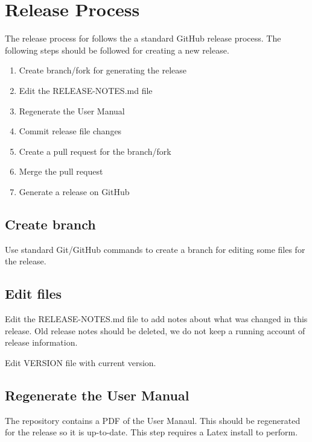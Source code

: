 
\chapter{Release Process}
\label{Release Process}

The release process for \parflow{} follows the a standard GitHub
release process.  The following steps should be followed for creating a new
\parflow{} release.

\begin{enumerate}
	\item Create branch/fork for generating the release
	\item Edit the RELEASE-NOTES.md file
	\item Regenerate the \parflow{} User Manual
        \item Commit release file changes
        \item Create a pull request for the branch/fork
        \item Merge the pull request
        \item Generate a release on GitHub
\end{enumerate}


\section{Create branch}

Use standard Git/GitHub commands to create a branch for editing some files for the release.

\section{Edit files}

Edit the RELEASE-NOTES.md file to add notes about what was changed in
this release.  Old release notes should be deleted, we do not keep a
running account of release information.

Edit VERSION file with current version.

\section{Regenerate the \parflow{} User Manual}

The repository contains a PDF of the User Manaul.  This should be
regenerated for the release so it is up-to-date.  This step requires
a Latex install to perform.

